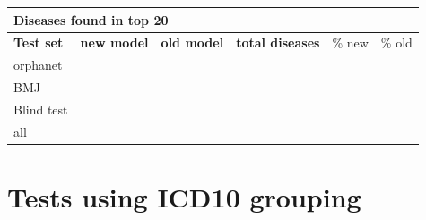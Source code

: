 \documentclass[10pt,letterpaper,final]{article}
\begin{document}
\begin{center}
\begin{small}
\begin{tabular}{l|cc||ccc}
	\multicolumn{6}{l}{\textbf{Diseases found in top 20}} \\ \hline
\textbf{Test set} & \textbf{new model} &	\textbf{old model}	 &	\textbf{total diseases} &	\% new	 &\% old \\ \hline
orphanet    &       &      &       &      & \\
BMJ	        &       &      &       &      & \\
Blind test	&       &      &       &      & \\ \hline \hline
all	        &       &      &       &      & \\ \hline
\end{tabular}
\end{small}
\end{center}


\newpage
\section{Tests using ICD10 grouping}
\end{document}
